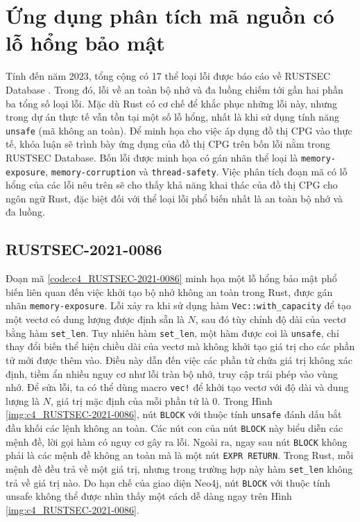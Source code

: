 \section{Ứng dụng phân tích mã nguồn có lỗ hổng bảo mật}

Tính đến năm 2023, tổng cộng có 17 thể loại lỗi được báo cáo về RUSTSEC Database \cite{zheng2023closer}.
Trong đó, lỗi về an toàn bộ nhớ và đa luồng chiếm tới gần hai phần ba tổng số loại lỗi.
Mặc dù Rust có cơ chế để khắc phục những lỗi này, nhưng trong dự án thực tế vẫn tồn tại một số lỗ hổng, nhất là khi sử dụng tính năng \texttt{unsafe} (mã không an toàn).
Để minh họa cho việc áp dụng đồ thị CPG vào thực tế, khóa luận sẽ trình bày ứng dụng của đồ thị CPG trên bốn lỗi nằm trong RUSTSEC Database.
Bốn lỗi được minh họa có gán nhãn thể loại là \texttt{memory-exposure}, \texttt{memory-corruption} và \texttt{thread-safety}.
Việc phân tích đoạn mã có lỗ hổng của các lỗi nêu trên sẽ cho thấy khả năng khai thác của đồ thị CPG cho ngôn ngữ Rust, đặc biệt đối với thể loại lỗi phổ biến nhất là an toàn bộ nhớ và đa luồng.


\subsection{RUSTSEC-2021-0086}

Đoạn mã \ref{code:c4_RUSTSEC-2021-0086} minh họa một lỗ hổng bảo mật phổ biến liên quan đến việc khởi tạo bộ nhớ không an toàn trong Rust, được gán nhãn \texttt{memory-exposure}.
Lỗi xảy ra khi sử dụng hàm \texttt{Vec::with\_capacity} để tạo một vectơ có dung lượng được định sẵn là $N$, sau đó tùy chỉnh độ dài của vectơ bằng hàm \texttt{set\_len}.
Tuy nhiên hàm \texttt{set\_len}, một hàm được coi là \texttt{unsafe}, chỉ thay đổi biến thể hiện chiều dài của vectơ mà không khởi tạo giá trị cho các phần tử mới được thêm vào.
Điều này dẫn đến việc các phần tử chứa giá trị không xác định, tiềm ẩn nhiều nguy cơ như lỗi tràn bộ nhớ, truy cập trái phép vào vùng nhớ.
Để sửa lỗi, ta có thể dùng macro \texttt{vec!} để khởi tạo vectơ với độ dài và dung lượng là $N$, giá trị mặc định của mỗi phần tử là $0$.
Trong Hình \ref{img:c4_RUSTSEC-2021-0086}, nút \texttt{BLOCK} với thuộc tính \texttt{unsafe} đánh dấu bắt đầu khối các lệnh không an toàn.
Các nút con của nút \texttt{BLOCK} này biểu diễn các mệnh đề, lời gọi hàm có nguy cơ gây ra lỗi.
Ngoài ra, ngay sau nút \texttt{BLOCK} không phải là các mệnh đề không an toàn mà là một nút \texttt{EXPR RETURN}.
Trong Rust, mỗi mệnh đề đều trả về một giá trị, nhưng trong trường hợp này hàm \texttt{set\_len} không trả về giá trị nào.
Do hạn chế của giao diện Neo4j, nút \texttt{BLOCK} với thuộc tính {unsafe} không thể được nhìn thấy một cách dễ dàng ngay trên Hình \ref{img:c4_RUSTSEC-2021-0086}.


